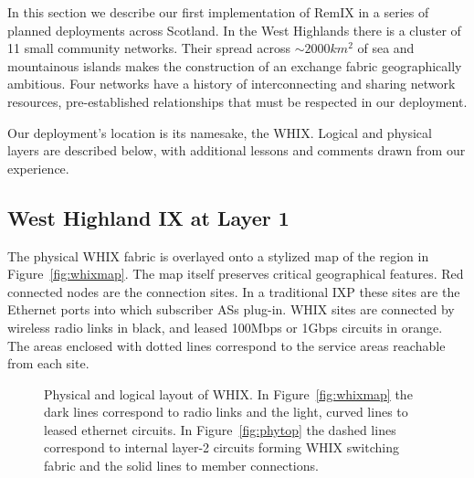 
In this section we describe our first implementation of RemIX in a series of planned deployments across Scotland. In the West Highlands there
is a cluster of
11 small community networks. Their spread across $\sim 2000km^2$
of sea and mountainous islands makes the
construction of an exchange fabric geographically ambitious. Four networks have
a history of interconnecting and sharing network resources, pre-established
relationships that must be respected in our deployment.

Our deployment's location is its namesake, the \ac{WHIX}.
Logical
and physical layers are described below, with additional lessons and
comments drawn from our experience.

\subsection{West Highland IX at Layer 1}

The physical \ac{WHIX} fabric is overlayed onto a stylized map of the region in
Figure~\ref{fig:whixmap}. The map itself preserves critical geographical
features. Red connected nodes are the connection sites. In a traditional
\ac{IXP} these sites are the Ethernet ports into which subscriber \acp{AS}
plug-in. WHIX sites are connected by wireless radio links in black, and leased
100Mbps or 1Gbps circuits in orange. The areas enclosed with dotted lines
correspond to the service areas reachable from each site.
\begin{figure*}
  \centering
  \hfil %
  \caption{Physical and logical layout of \ac{WHIX}. In
  Figure~\ref{fig:whixmap} the dark lines correspond to radio links
  and the light, curved lines to leased ethernet circuits.
  In Figure~\ref{fig:phytop} the dashed lines
  correspond to internal layer-2 circuits forming \ac{WHIX}
  switching fabric and the solid lines to member connections.}
\end{figure*}

